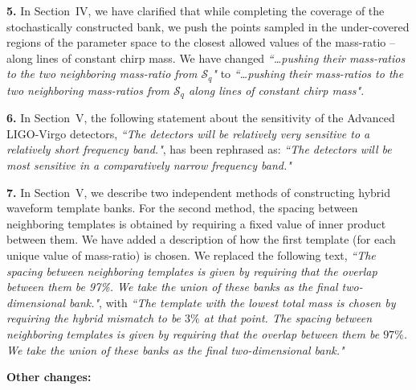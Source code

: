 \documentclass[a4paper,12pt]{article}
\begin{document}
{\bf 5.}
In Section~IV, we have clarified that while completing the coverage
of the stochastically constructed bank, we push the points sampled in 
the under-covered regions of the parameter space to the closest allowed
values of the mass-ratio -- along lines of constant chirp mass.
We have changed \textit{``\dots pushing their mass-ratios to the two 
neighboring mass-ratio from $\mathcal{S}_q$"} to 
{\it ``\dots pushing their mass-ratios to the two neighboring mass-ratios
from $\mathcal{S}_q$ along lines of constant chirp mass".}

\vspace{8pt}

{\bf 6.}
In Section~V, the following statement about the sensitivity of the 
Advanced LIGO-Virgo detectors, 
\textit{``The detectors will be relatively very sensitive to a relatively
short frequency band."}, has been rephrased as: {\it ``The detectors will
be most sensitive in a comparatively narrow frequency band."}
\vspace{8pt}

{\bf 7.}
In Section~V, we describe two independent methods of constructing
hybrid waveform template banks. For the second method, the 
spacing between neighboring templates is obtained by requiring a 
fixed value of inner product between them. We have added a description 
of how the first template (for each unique value of mass-ratio) is chosen.
We replaced the following text, 
\textit{``The spacing between neighboring templates is given by requiring
that the overlap between them be 97\%. We take the union of these banks
as the final two-dimensional bank."}, with
{\it ``The template with the lowest total mass is chosen by requiring the
 hybrid mismatch to be $3\%$ at that point. The spacing between 
 neighboring templates is given by requiring that the overlap between
 them be $97\%$. We take the union of these banks as the final 
 two-dimensional bank."}
\newline
 \vspace{8pt}

\textbf{Other changes:}
\newline
\end{document}
